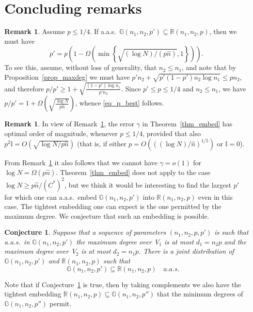 \documentclass[12pt,reqno]{amsart}
\newcommand{\R} {\mathbb R}
\newcommand{\Rnnp}{\R(n_1,n_2,p)}
\newcommand{\G} {\mathbb G}
\newcommand{\I} {\mathbb I}
\newtheorem{conjecture}{Conjecture}
\theoremstyle{definition}
\newtheorem{remark}[theorem]{Remark}
\begin{document}
\section{Concluding remarks}
\label{sec_concluding}
\begin{remark}
  \label{rem_best_gamma}
	Assume $p \le 1/4$. If a.a.s.\ $\G(n_1, n_2, p') \subseteq \Rnnp$, then we must have
	\begin{equation}
	  \label{eq_p_best}
		p' = p \left(1 - \Omega \left( \min \left\{ \sqrt{(\log N)/(p \hat n)}, 1  \right\}\right)\right).
	\end{equation}
	To see this, assume, without loss of generality, that $n_2 \le n_1$, and note that by Proposition~\ref{prop_maxdeg} we must have $p'n_2 + \sqrt{p'(1 - p')n_2\log n_1} \le pn_2$, and therefore $p/p' \ge 1 + \sqrt{\frac{(1 - p')\log n_1}{p'n_2}} $. Since $p' \le p \le 1/4$ and $n_2 \le n_1$, we have $p/p' = 1 + \Omega\left( \sqrt{\tfrac{\log N}{p\hat n }} \right)$, whence \eqref{eq_p_best} follows.
	\end{remark}

\begin{remark}
  \label{rem_optimality}
  In view of Remark~\ref{rem_best_gamma}, the error $\gamma$ in Theorem~\ref{thm_embed} has optimal order of magnitude, whenever $p \le 1/4$, provided that also $p^2 \I = O\left( \sqrt{\log N / p \hat n} \right)$ (that is, if either $p = O\left( \left( (\log N)/\hat n \right)^{1/5}\right)$ or $\I = 0$).

  From Remark~\ref{rem_best_gamma} it also follows that we cannot have $\gamma = o(1)$ for $\log N = \Omega(p\hat n )$.  Theorem~\ref{thm_embed} does not apply to the case $\log N \ge p\hat n /(C^*)^2$, but we think it would be interesting to find the largest $p'$ for which one can a.a.s.\ embed $\G(n_1,n_2,p')$ into $\Rnnp$ even in this case. The tightest embedding one can expect is the one permitted by the maximum degree. We conjecture that such an embedding is possible.
\end{remark}

\begin{conjecture}
  \label{conj}
	Suppose that a sequence of parameters $(n_1, n_2, p, p')$ is such that a.a.s.\ in $\G(n_1, n_2, p')$ the maximum degree over~$V_1$ is at most $d_1 = n_2p$ and the maximum degree over~$V_2$ is at most $d_2 = n_1p$. There is a joint distribution of $\G(n_1, n_2, p')$ and $\Rnnp$ such that
	\begin{equation*}
		\G(n_1, n_2, p') \subseteq \Rnnp \quad a.a.s. \quad
	\end{equation*}
\end{conjecture}
Note that if Conjecture~\ref{conj} is true, then by taking complements we also have the tightest embedding $\Rnnp \subseteq \G(n_1,n_2,p'')$ that the minimum degrees of $\G(n_1,n_2,p'')$ permit.
\end{document}
